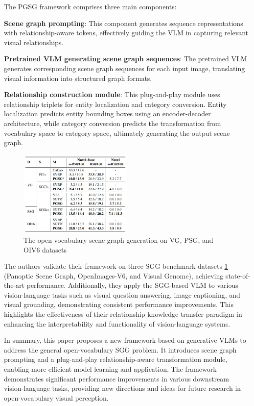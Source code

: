 The PGSG framework comprises three main components:

\textbf{Scene graph prompting}: This component generates sequence representations with relationship-aware tokens, effectively guiding the VLM in capturing relevant visual relationships.

\textbf{Pretrained VLM generating scene graph sequences}: The pretrained VLM generates corresponding scene graph sequences for each input image, translating visual information into structured graph formats.

\textbf{Relationship construction module}: This plug-and-play module uses relationship triplets for entity localization and category conversion. Entity localization predicts entity bounding boxes using an encoder-decoder architecture, while category conversion predicts the transformation from vocabulary space to category space, ultimately generating the output scene graph.


\begin{figure}[h]
    \centering
    \includegraphics[width=0.5\textwidth]{img/result1_1.jpg} %
    \caption{The open-vocabulary scene graph generation on VG, PSG, and OIV6 datasets}
    \label{fig:pgsg}
\end{figure}


The authors validate their framework on three SGG benchmark datasets \ref{fig:pgsg} (Panoptic Scene Graph, OpenImages-V6, and Visual Genome), achieving state-of-the-art performance. Additionally, they apply the SGG-based VLM to various vision-language tasks such as visual question answering, image captioning, and visual grounding, demonstrating consistent performance improvements. This highlights the effectiveness of their relationship knowledge transfer paradigm in enhancing the interpretability and functionality of vision-language systems.

In summary, this paper proposes a new framework based on generative VLMs to address the general open-vocabulary SGG problem. It introduces scene graph prompting and a plug-and-play relationship-aware transformation module, enabling more efficient model learning and application. The framework demonstrates significant performance improvements in various downstream vision-language tasks, providing new directions and ideas for future research in open-vocabulary visual perception.


